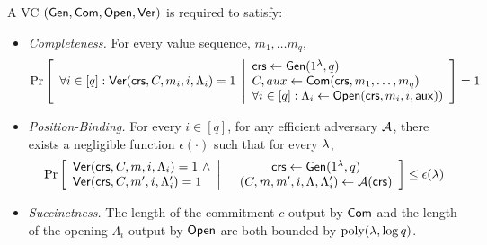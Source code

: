 \begin{definition} \label{def:VC}
A VC $(\mathsf{Gen}, \mathsf{Com}, \mathsf{Open}, \mathsf{Ver})$ is required to satisfy:
\vspace{-1ex}
\begin{itemize}
    \item \emph{Completeness. } For every value sequence, $m_1,\ldots m_q$,
\begin{gather*}
    \underset{}{\text{Pr}}\left [
    \begin{array}{ll}
    \forall i\in [q]: 
         \mathsf{Ver}(\mathsf{crs}, C, m_i, i, \Lambda_i) = 1
    \end{array}
    \middle\vert
    \begin{array}{ll}
         \mathsf{crs} \leftarrow \mathsf{Gen}(1^\lambda, q)\\
         C, aux\leftarrow\mathsf{Com}(\mathsf{crs}, m_1,\ldots,m_q) \\
         \forall i\in [q]: \Lambda_i \leftarrow \mathsf{Open}(\mathsf{crs}, m_i, i, \mathsf{aux}))
    \end{array}
    \right ] = 1
\end{gather*}
    \item \emph{Position-Binding.} For every $i\in [q]$, for any efficient adversary $\mathcal{A}$, there exists a negligible function $\epsilon(\cdot)$ such that for every $\lambda$, %
\begin{gather*}
    \underset{}{\text{Pr}}\left [
    \begin{array}{ll}
    \mathsf{Ver}(\mathsf{crs}, C, m, i, \Lambda_i) = 1 \ \wedge \\
    \mathsf{Ver}(\mathsf{crs}, C, m', i, \Lambda_i') = 1
    \end{array}
    \middle\vert
    \begin{array}{cc}
         &  \mathsf{crs} \leftarrow \mathsf{Gen}(1^\lambda, q)\\
         & (C, m, m', i, \Lambda, \Lambda_i')\leftarrow\mathcal{A}(\mathsf{crs})
    \end{array}
    \right ] \leq \epsilon(\lambda)
\end{gather*}
    \item \emph{Succinctness.} The length of the commitment $c$ output by $\mathsf{Com}$ and the length of the opening $\Lambda_i$ output by $\mathsf{Open}$ are both bounded by $\operatorname{poly}(\lambda, \log q)$.
\end{itemize}
\end{definition}


